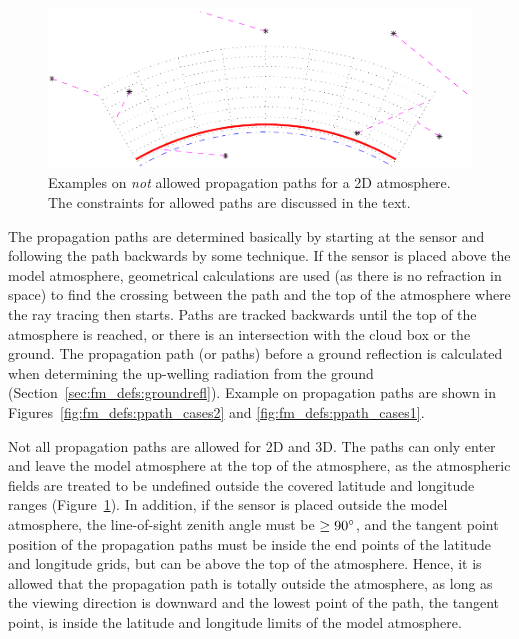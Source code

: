 \begin{figure}[!t]
 \begin{center}
  \includegraphics*[width=0.95\hsize]{Figs/fm_definitions/ppath_badcases}
  \caption{Examples on \emph{not} allowed propagation paths for a 2D 
    atmosphere. The constraints for allowed paths are discussed in the
    text.}
  \label{fig:fm_defs:ppath_badcases}
 \end{center}
\end{figure}


The propagation paths are determined basically by starting at the
sensor and following the path backwards by some  technique. If the sensor is placed above the model
atmosphere, geometrical calculations are used (as there is no
refraction in space) to find the crossing between the path and the top
of the atmosphere where the ray tracing then starts. Paths are tracked
backwards until the top of the atmosphere is reached, or there is an
intersection with the cloud box or the ground. The propagation path
(or paths) before a ground reflection is calculated when determining
the up-welling radiation from the ground
(Section~\ref{sec:fm_defs:groundrefl}). Example on propagation
paths are shown in Figures~\ref{fig:fm_defs:ppath_cases2} and 
\ref{fig:fm_defs:ppath_cases1}.
 
Not all propagation paths are allowed for 2D and 3D. The paths can
only enter and leave the model atmosphere at the top of the
atmosphere, as the atmospheric fields are treated to be undefined
outside the covered latitude and longitude ranges
(Figure~\ref{fig:fm_defs:ppath_badcases}). In addition, if the sensor
is placed outside the model atmosphere, the line-of-sight zenith angle
must be $\geq90^\circ$, and the tangent point position of the
propagation paths must be inside the end points of the latitude and
longitude grids, but can be above the top of the atmosphere. Hence, it
is allowed that the propagation path is totally outside the
atmosphere, as long as the viewing direction is downward and the
lowest point of the path, the tangent point, is inside the latitude
and longitude limits of the model atmosphere.

